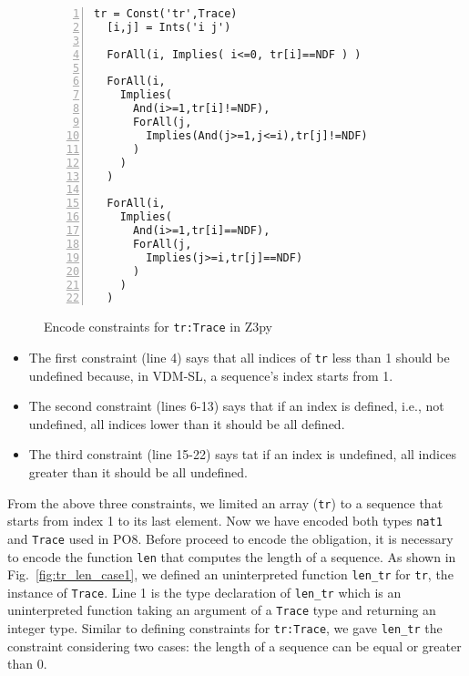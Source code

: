 \begin{figure}[t]
\begin{center}
\begin{mdframed}[roundcorner=5pt,shadow=true]
\begin{Verbatim}[fontsize=\small,numbers=left]
  tr = Const('tr',Trace)
  [i,j] = Ints('i j')

  ForAll(i, Implies( i<=0, tr[i]==NDF ) )

  ForAll(i,
    Implies(
      And(i>=1,tr[i]!=NDF),
      ForAll(j,
        Implies(And(j>=1,j<=i),tr[j]!=NDF)
      )
    )
  )

  ForAll(i,
    Implies(
      And(i>=1,tr[i]==NDF),
      ForAll(j,
        Implies(j>=i,tr[j]==NDF)
      )
    )
  )
\end{Verbatim}
\end{mdframed}
\vspace{-10pt}
\caption{Encode constraints for {\tt tr:Trace} in Z3py}
\label{fig:tr_constraint_case1}
\end{center}
\vspace{-20pt}
\end{figure}



\begin{itemize}
\item
The first constraint (line 4) says that all indices of {\tt tr} less than 1 should be undefined because, in VDM-SL, a sequence's index starts from 1.
\item
The second constraint (lines 6-13) says that if an index is defined, i.e., not undefined, all indices lower than it should be all defined.
\item
The third constraint (line 15-22) says tat if an index is undefined, all indices greater than it should be all undefined.
\end{itemize}

From the above three constraints, we limited an array ({\tt tr}) to a sequence that starts from index 1 to its last element. Now we have encoded both types {\tt nat1} and {\tt Trace} used in PO8. Before proceed to encode the obligation, it is necessary to encode the function {\tt len} that computes the length of a sequence. As shown in Fig.~\ref{fig:tr_len_case1}, we defined an uninterpreted function {\tt len\_tr} for {\tt tr}, the instance of {\tt Trace}. Line 1 is the type declaration of {\tt len\_tr} which is an uninterpreted function taking an argument of a {\tt Trace} type and returning an integer type. Similar to defining constraints for {\tt tr:Trace}, we gave {\tt len\_tr} the constraint considering two cases: the length of a sequence can be equal or greater than 0.

